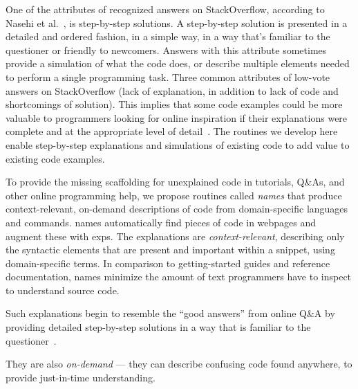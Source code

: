 \begin{changes}
One of the attributes of recognized answers on StackOverflow, according to Nasehi et al.~\cite{nasehi_what_2012}, is step-by-step solutions.
A step-by-step solution is presented in a detailed and ordered fashion, in a simple way, in a way that's familiar to the questioner or friendly to newcomers.
Answers with this attribute sometimes provide a simulation of what the code does, or describe multiple elements needed to perform a single programming task. 
Three common attributes of low-vote answers on StackOverflow (lack of explanation, in addition to lack of code and shortcomings of solution).
This implies that some code examples could be more valuable to programmers looking for online inspiration if their explanations were complete and at the appropriate level of detail~\cite{nasehi_what_2012}.
\fi
The routines we develop here enable step-by-step explanations and simulations of existing code to add value to existing code examples.
\end{changes}
\fi

To provide the missing scaffolding for unexplained code in tutorials, Q\&As, and other online programming help, we propose routines called \emph{\Glspl{name}} that produce context-relevant, on-demand descriptions of code from domain-specific languages and commands.
\Glspl{name} automatically find pieces of code in webpages and augment these with \glspl{exp}.
The explanations are \emph{context-relevant}, describing only the syntactic elements that are present and important within a snippet, using domain-specific terms.
In comparison to getting-started guides and reference documentation, \glspl{name} minimize the amount of text programmers have to inspect to understand source code.
\begin{changes}
Such explanations begin to resemble the ``good answers'' from online Q\&A by providing detailed step-by-step solutions in a way that is familiar to the questioner~\cite{nasehi_what_2012}.
\end{changes}
They are also \emph{on-demand} --- they can describe confusing code found anywhere, to provide just-in-time understanding.

